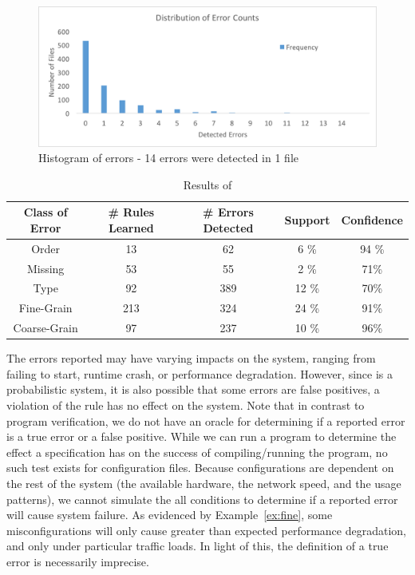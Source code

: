 \begin{figure}[h]
\includegraphics[width=\textwidth]{figs/histogram.png}
\caption{Histogram of errors - 14 errors were detected in 1 file}
\label{fig:histo}
\end{figure}

\begin{table}[h]
\centering
\caption{Results of \app}
\label{table:learning}
\setlength{\tabcolsep}{0.5em}
\begin{tabular}{|c|c|c|c|c|}
\hline
{\bf Class of Error } & {\bf \# Rules Learned} & {\bf \# Errors Detected} & {\bf Support} & {\bf Confidence}\\ 
\hline
\hline
Order        & 13  & 62   & 6 \%  & 94 \% \\ 
Missing      & 53  & 55   & 2 \%  & 71\% \\ 
Type         & 92  & 389  & 12 \% & 70\%  \\ 
Fine-Grain   & 213 & 324  & 24 \% & 91\%  \\ 
Coarse-Grain & 97  & 237  & 10 \% & 96\% \\ 
\hline 
\end{tabular}
\end{table}

The errors reported may have varying impacts on the system, ranging from failing to start, runtime crash, or performance degradation.
However, since \app is a probabilistic system, it is also possible that some errors are false positives, a violation of the rule has no effect on the system.
Note that in contrast to program verification, we do not have an oracle for determining if a reported error is a true error or a false positive.
While we can run a program to determine the effect a specification has on the success of compiling/running the program, no such test exists for configuration files.
Because configurations are dependent on the rest of the system (\ie the available hardware, the network speed, and the usage patterns), we cannot simulate the all conditions to determine if a reported error will cause system failure.
As evidenced by Example~\ref{ex:fine}, some misconfigurations will only cause greater than expected performance degradation, and only under particular traffic loads.
In light of this, the definition of a true error is necessarily imprecise.

